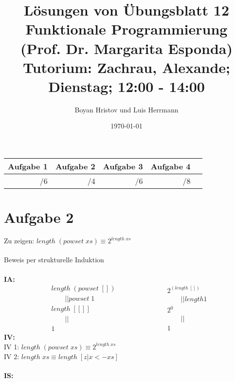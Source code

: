 \documentclass[11]{article}
\begin{document}
\title
{
L\"osungen von \"Ubungsblatt 12 \\
Funktionale Programmierung (Prof. Dr. Margarita Esponda) \\
\normalsize Tutorium: Zachrau, Alexande; Dienstag; 12:00 - 14:00
}
\author{Boyan Hristov und Luis Herrmann}
\date{\today}
\maketitle

\begin{tabular}{|r|r|r|r|r}
\hline 
Aufgabe 1 & Aufgabe 2 & Aufgabe 3 & Aufgabe 4 \\ 
\hline 
/6 & /4 & /6 & /8\\ 
\hline 
\end{tabular}
%
\section*{Aufgabe 2}
Zu zeigen: $length \; (powset \; xs) \equiv 2^{length \; xs}$ \\ \\
Beweis per strukturelle Induktion \\ \\
%
\textbf{IA: } \\
\begin{equation*}
\begin{aligned}
& length \; (powset \; []) \\
& \qquad || powset \; 1 \\
& length \; [[]] \\
& \qquad || \\
& 1
\end{aligned}
\qquad \qquad \qquad
\begin{aligned}
& 2^{(length \; [])}\\
& \qquad || length 1 \\
& 2^0  \qquad \\
& \qquad || \\
& 1
\end{aligned}
\end{equation*}
%
\textbf{IV: } \\
IV 1: $length \; (powset \; xs) \equiv 2^{length \; xs}$ \\
IV 2: $length \; xs \equiv length \; [z|x <- xs]$ \\\\
%
\textbf{IS: } \\
%
\end{document}
